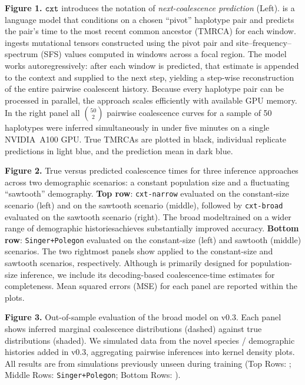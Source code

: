 \documentclass[9pt,twocolumn,twoside]{pnas-new}
\begin{document}
\textbf{Figure 1.}
$\texttt{cxt}$ introduces the notation of \textit{next-coalescence prediction}
(Left). \cxtkit{} is a language model that conditions on a chosen ``pivot'' haplotype pair and
predicts the pair's time to the most recent common ancestor (TMRCA) for each window.
\cxtkit ingests mutational tensors constructed using the pivot pair and site--frequency--spectrum (SFS) values
computed in windows across a focal region.
The model works autoregressively: after each window is predicted,
that estimate is appended to the context and supplied to the next step,
yielding a step-wise reconstruction of the entire pairwise coalescent history.
Because every haplotype pair can be processed in parallel, the approach scales efficiently with available GPU memory.
In the right panel all $\binom{50}{2}$ pairwise coalescence curves for a sample of 50 haplotypes were inferred simultaneously in under five minutes on a single NVIDIA~A100 GPU.
True TMRCAs are plotted in black, individual replicate predictions in light blue, and the prediction mean in dark blue.

\textbf{Figure 2.}
True versus predicted coalescence times for three inference approaches across two demographic
scenarios: a constant population size and a fluctuating ``sawtooth'' demography.
\textbf{Top row}: \texttt{cxt-narrow} evaluated on the constant-size scenario (left) and on the sawtooth scenario (middle), followed by \texttt{cxt-broad} evaluated on the sawtooth scenario (right). The broad model\textemdash trained on a wider range of demographic histories\textemdash achieves substantially improved accuracy.
\textbf{Bottom row}: \texttt{Singer+Polegon} evaluated on the constant-size (left) and sawtooth (middle) scenarios. The two rightmost panels show \smcpp{} applied to the constant-size and sawtooth scenarios, respectively. Although \smcpp{} is primarily designed for population-size inference, we include its decoding-based coalescence-time estimates for completeness. Mean squared errors (MSE) for each panel are reported within the plots.

\textbf{Figure 3.}
Out-of-sample evaluation of the broad model on \stdpopsim v0.3. Each panel shows inferred marginal coalescence distributions (dashed) against true distributions (shaded).
We simulated data from the novel species / demographic histories added in \stdpopsim v0.3, aggregating pairwise inferences into kernel density plots.
All results are from simulations previously unseen during training (Top Rows: \cxtkit; Middle Rows: \texttt{Singer+Polegon}; Bottom Rows: \smcpp).
\end{document}

